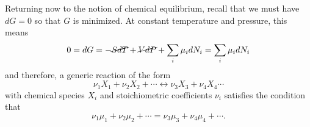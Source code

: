 

Returning now to the notion of chemical equilibrium, recall that we must have $dG=0$ so that $G$ is minimized. At constant temperature and pressure, this means
\begin{equation}
  0 = dG = -\cancel{SdT} + \cancel{VdP} + \sum_i \mu_i dN_i = \sum_i\mu_i dN_i
\end{equation}
and therefore, a generic reaction of the form
\begin{equation}
  \nu_1X_1 + \nu_2X_2 + \cdots \leftrightarrow \nu_3 X_3 + \nu_4 X_4 \cdots
\end{equation}
with chemical species $X_i$ and stoichiometric coefficients $\nu_i$ satisfies the condition that
\begin{equation}
  \nu_1\mu_1 + \nu_2\mu_2 + \cdots = \nu_3\mu_3 + \nu_4\mu_4 + \cdots.
\end{equation}

